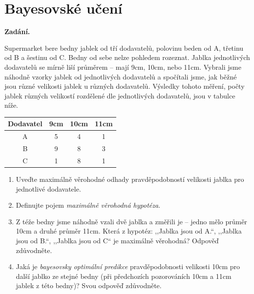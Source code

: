 \section{Bayesovské učení}

\noindent\textbf{Zadání.}\par
Supermarket bere bedny jablek od tří dodavatelů, polovinu beden od A, třetinu od B a šestinu od C. Bedny od sebe nelze pohledem rozeznat. Jablka jednotlivých dodavatelů se mírně liší průměrem -- mají 9cm, 10cm, nebo 11cm. Vybrali jsme náhodně vzorky jablek od jednotlivých dodavatelů a spočítali jsme, jak běžné jsou různé velikosti jablek u různých dodavatelů. Výsledky tohoto měření, počty jablek různých velikostí rozdělené dle jednotlivých dodavatelů, jsou v tabulce níže.

\begin{center}
\begin{tabular}{c|ccc}
\toprule
Dodavatel & 9cm & 10cm & 11cm \\
\midrule
A & 5 & 4 & 1 \\
B & 9 & 8 & 3 \\
C & 1 & 8 & 1 \\
\bottomrule
\end{tabular}
\end{center}

\begin{enumerate}[nosep]
  \item Uveďte maximálně věrohodné odhady pravděpodobností velikosti jablka pro jednotlivé dodavatele.
  \item Definujte pojem \textit{maximálně věrohodná hypotéza}.
  \item Z téže bedny jsme náhodně vzali dvě jablka a změřili je -- jedno mělo průměr 10cm a druhé průměr 11cm. Která z hypotéz: ,,Jablka jsou od A.``, ,,Jablka jsou od B.``, ,,Jablka jsou od C`` je maximálně věrohodná? Odpověď zdůvodněte.
  \item Jaká je \textit{bayesovsky optimální predikce} pravděpodobnosti velikosti 10cm pro další jablko ze stejné bedny (při předchozích pozorováních 10cm a 11cm jablek z této bedny)? Svou odpověď zdůvodněte.
\end{enumerate}

